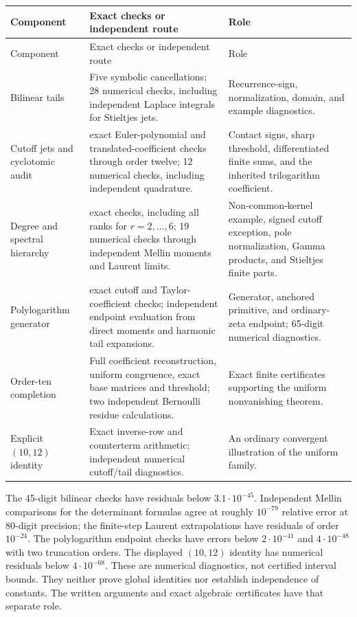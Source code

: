 \documentclass[11pt]{article}
\theoremstyle{definition}
\theoremstyle{remark}
\numberwithin{equation}{section}
\begin{document}
\begingroup\small
\begin{longtable}{@{}>{\raggedright\arraybackslash}p{}>{\raggedright\arraybackslash}p{}>{\raggedright\arraybackslash}p{}@{}}
\toprule
Component & Exact checks or independent route & Role \\
\midrule\endfirsthead
\toprule Component & Exact checks or independent route & Role \\
\midrule\endhead
Bilinear tails & Five symbolic cancellations; 28 numerical checks,
including independent Laplace integrals for Stieltjes jets. &
Recurrence-sign, normalization, domain, and example diagnostics. \\
\addlinespace
Cutoff jets and cyclotomic audit & 74 exact Euler-polynomial and
translated-coefficient checks through order twelve; 12 numerical
checks, including independent quadrature. & Contact signs, sharp
threshold, differentiated finite sums, and the inherited trilogarithm
coefficient. \\
\addlinespace
Degree and spectral hierarchy & 45 exact checks, including all
ranks for $r=2,\ldots,6$; 19 numerical checks through independent
Mellin moments and Laurent limits. & Non-common-kernel example,
signed cutoff exception, pole normalization, Gamma products, and
Stieltjes finite parts. \\
\addlinespace
Polylogarithm generator & 122 exact cutoff and Taylor-coefficient
checks; independent endpoint evaluation from direct moments and
harmonic tail expansions. & Generator, anchored primitive, and
ordinary-zeta endpoint; 65-digit numerical diagnostics. \\
\addlinespace
Order-ten completion & Full coefficient reconstruction, uniform
congruence, exact base matrices and threshold; two independent
Bernoulli residue calculations. & Exact finite certificates supporting
the uniform nonvanishing theorem. \\
\addlinespace
Explicit $(10,12)$ identity & Exact inverse-row and counterterm
arithmetic; independent numerical cutoff/tail diagnostics. & An
ordinary convergent illustration of the uniform family. \\
\bottomrule
\end{longtable}
\endgroup

The 45-digit bilinear checks have residuals below $3.1\cdot10^{-45}$.
Independent Mellin comparisons for the determinant formulas agree
at roughly $10^{-79}$ relative error at 80-digit precision;
the finite-step Laurent extrapolations have residuals of order
$10^{-24}$. The polylogarithm endpoint checks have errors below
$2\cdot10^{-41}$ and $4\cdot10^{-48}$ with two truncation orders.
The displayed $(10,12)$ identity has numerical residuals
below $4\cdot10^{-68}$. These are numerical diagnostics, not certified
interval bounds. They neither prove global identities nor establish
independence of constants. The written arguments and exact algebraic
certificates have that separate role.
\end{document}
